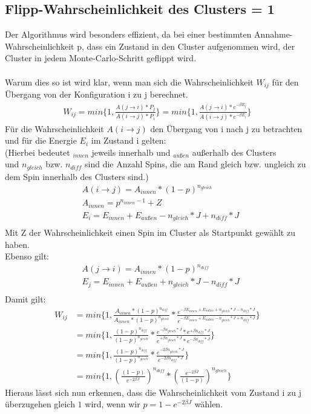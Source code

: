 \subsection{Flipp-Wahrscheinlichkeit des Clusters = 1}
Der Algorithmus wird besonders effizient, da bei einer bestimmten Annahme-Wahrscheinlichkeit p, dass ein Zustand in den Cluster aufgenommen wird, der Cluster in jedem Monte-Carlo-Schritt geflippt wird.\\\\
Warum dies so ist wird klar, wenn man sich die Wahrscheinlichkeit $W_{ij}$ für den Übergang von der Konfiguration i zu j berechnet.
\begin{align}
W_{ij} = min\{1, \frac{A(j \rightarrow i) * P_j}{A(i \rightarrow j) * P_i} \} = min\{1, \frac{A(j \rightarrow i) * e^{-\beta E_j}}{A(i \rightarrow j) * e^{-\beta E_i}} \}
\end{align}
Für die Wahrscheinlichkeit $A(i \rightarrow j)$ den Übergang von i nach j zu betrachten und für die Energie $E_i$ im Zustand i gelten:\\
(Hierbei bedeutet $_{innen}$ jeweils innerhalb und $_{außen}$ außerhalb des Clusters\\
und $n_{gleich}$ bzw. $n_{diff}$ sind die Anzahl Spins, die am Rand gleich bzw. ungleich zu dem Spin innerhalb des Clusters sind.)
\begin{align}
&A(i \rightarrow j)=A_{innen} * (1 - p)^{n_{gleich}}\\
&A_{innen} = p^{n_{innen}-1} + Z\\
&E_i = E_{innen} + E_{außen} - n_{gleich} * J + n_{diff} * J\\
\end{align}
Mit Z der Wahrscheinlichkeit einen Spin im Cluster als Startpunkt gewählt zu haben.\\
Ebenso gilt:
\begin{align}
&A(j \rightarrow i)=A_{innen} * (1 - p)^{n_{diff}}\\
&E_j = E_{innen} + E_{außen} + n_{gleich} * J - n_{diff} * J\\
\end{align}
Damit gilt:
\begin{align}
W_{ij} &= min\{1, \frac{A_{innen}*(1-p)^{n_{diff}}}{A_{innen}*(1-p)^{n_{gleich}}} * \frac{e^{-\beta E_{innen} + E_{außen} + n_{gleich} * J - n_{diff} * J}}{e^{-\beta E_{innen} + E_{außen} - n_{gleich} * J + n_{diff} * J}}\} \\
&= min\{1, \frac{(1-p)^{n_{diff}}}{(1-p)^{n_{gleich}}} * \frac{e^{-\beta n_{gleich} * J} * e^{+\beta n_{diff} * J}}{e^{+\beta n_{gleich} * J} * e^{-\beta n_{diff} * J}}\}\\
&= min\{1, \frac{(1-p)^{n_{diff}}}{(1-p)^{n_{gleich}}} * \frac{e^{-2\beta n_{gleich} * J}}{e^{-2\beta n_{diff} * J}}\}\\
&= min\{1, \left(\frac{(1-p)}{e^{-2\beta J}}\right)^{n_{diff}} * \left(\frac{e^{-2\beta J}}{(1-p)}\right)^{n_{gleich}}\}
\end{align}
Hieraus lässt sich nun erkennen, dass die Wahrscheinlichkeit vom Zustand i zu j überzugehen gleich $1$ wird, wenn wir $p = 1 - e^{-2\beta J}$ wählen.

